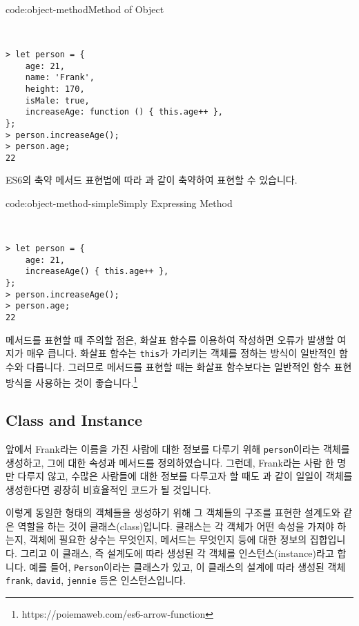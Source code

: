\begin{codeenv}{code:object-method}{Method of Object}\begin{verbatim}


> let person = {
    age: 21,
    name: 'Frank',
    height: 170,
    isMale: true,
    increaseAge: function () { this.age++ },
};
> person.increaseAge();
> person.age;
22
\end{verbatim}
\end{codeenv}

ES6의 축약 메서드 표현법에 따라 과 같이 축약하여 표현할 수 있습니다. 

\begin{codeenv}{code:object-method-simple}{Simply Expressing Method}\begin{verbatim}


> let person = {
    age: 21,
    increaseAge() { this.age++ },
};
> person.increaseAge();
> person.age;
22
\end{verbatim}
\end{codeenv}

메서드를 표현할 때 주의할 점은, 화살표 함수를 이용하여 작성하면 오류가 발생할 여지가 매우 큽니다. 화살표 함수는 \verb|this|가 가리키는 객체를 정하는 방식이 일반적인 함수와 다릅니다. 그러므로 메서드를 표현할 때는 화살표 함수보다는 일반적인 함수 표현 방식을 사용하는 것이 좋습니다.\footnote{https://poiemaweb.com/es6-arrow-function}

\subsection*{Class and Instance}

앞에서 Frank라는 이름을 가진 사람에 대한 정보를 다루기 위해 \verb|person|이라는 객체를 생성하고, 그에 대한 속성과 메서드를 정의하였습니다. 그런데, Frank라는 사람 한 명만 다루지 않고, 수많은 사람들에 대한 정보를 다루고자 할 때도 과 같이 일일이 객체를 생성한다면 굉장히 비효율적인 코드가 될 것입니다. 

이렇게 동일한 형태의 객체들을 생성하기 위해 그 객체들의 구조를 표현한 설계도와 같은 역할을 하는 것이 클래스(class)입니다. 클래스는 각 객체가 어떤 속성을 가져야 하는지, 객체에 필요한 상수는 무엇인지, 메서드는 무엇인지 등에 대한 정보의 집합입니다. 그리고 이 클래스, 즉 설계도에 따라 생성된 각 객체를 인스턴스(instance)라고 합니다. 예를 들어, \verb|Person|이라는 클래스가 있고, 이 클래스의 설계에 따라 생성된 객체 \verb|frank|, \verb|david|, \verb|jennie| 등은 인스턴스입니다. 

